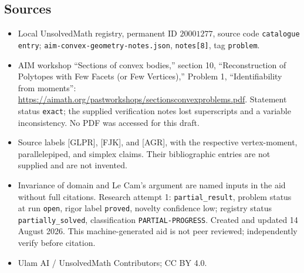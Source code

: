 \documentclass[11pt]{article}
\begin{document}
\subsection{Sources}
\begin{itemize}
\item Local UnsolvedMath registry, permanent ID \(20001277\), source code \texttt{catalogue entry}; \texttt{aim-convex-geometry-notes.json}, \texttt{notes[8]}, tag \texttt{problem}.
\item AIM workshop ``Sections of convex bodies,'' section 10, ``Reconstruction of Polytopes with Few Facets (or Few Vertices),'' Problem 1, ``Identifiability from moments'': \url{https://aimath.org/pastworkshops/sectionsconvexproblems.pdf}. Statement status \texttt{exact}; the supplied verification notes lost superscripts and a variable inconsistency. No PDF was accessed for this draft.
\item Source labels [GLPR], [FJK], and [AGR], with the respective vertex-moment, parallelepiped, and simplex claims. Their bibliographic entries are not supplied and are not invented.
\item Invariance of domain and Le Cam's argument are named inputs in the aid without full citations. Research attempt 1: \texttt{partial\_result}, problem status at run \texttt{open}, rigor label \texttt{proved}, novelty confidence low; registry status \texttt{partially\_solved}, classification \texttt{PARTIAL-PROGRESS}. Created and updated 14 August 2026. This machine-generated aid is not peer reviewed; independently verify before citation.
\item Ulam AI / UnsolvedMath Contributors; CC BY 4.0.
\end{itemize}
\end{document}
